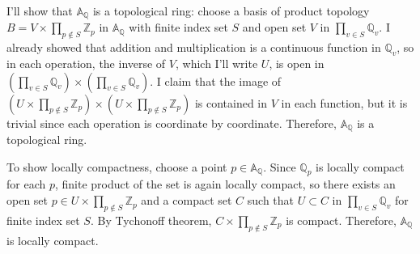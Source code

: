 \documentclass[a4paper, 12pt]{article}
\theoremstyle{Mydefinition}
\theoremstyle{Mytheorem}
\begin{document}
I'll show that $\mathbb{A}_\mathbb{Q}$ is a topological ring: choose a basis of product topology $B = V\times \prod_{p\notin S}\mathbb{Z}_p$ in $\mathbb{A}_\mathbb{Q}$ with finite index set $S$ and open set $V$ in $\prod_{v\in S}\mathbb{Q}_v$. I already showed that addition and multiplication is a continuous function in $\mathbb{Q}_v$, so in each operation, the inverse of $V$, which I'll write $U$, is open in $(\prod_{v\in S}\mathbb{Q}_v)\times (\prod_{v\in S}\mathbb{Q}_v)$. I claim that the image of $(U\times \prod_{p\notin S}\mathbb{Z}_p)\times(U\times \prod_{p\notin S}\mathbb{Z}_p)$ is contained in $V$ in each function, but it is trivial since each operation is coordinate by coordinate. Therefore, $\mathbb{A}_\mathbb{Q}$ is a topological ring.

To show locally compactness, choose a point $p\in \mathbb{A}_\mathbb{Q}$. Since $\mathbb{Q}_p$ is locally compact for each $p$, finite product of the set is again locally compact, so there exists an open set $p\in U\times \prod_{p\notin S}\mathbb{Z}_p$ and a compact set $C$ such that $U\subset C$ in $\prod_{v\in S}\mathbb{Q}_v$ for finite index set $S$. By Tychonoff theorem, $C\times \prod_{p\notin S}\mathbb{Z}_p$ is compact. Therefore, $\mathbb{A}_\mathbb{Q}$ is locally compact.
\end{document}
